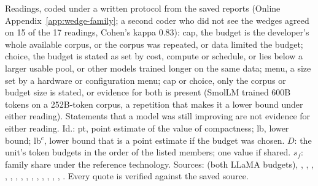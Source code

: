 \begin{table}[tp]
\medskip
\begin{tablenotes}
Readings, coded under a written protocol from the saved reports (Online Appendix~\ref{app:wedge-family}; a second coder who did not see the wedges agreed on 15 of the 17 readings, Cohen's kappa 0.83): cap, the budget is the developer's whole available corpus, or the corpus was repeated, or data limited the budget; choice, the budget is stated as set by cost, compute or schedule, or lies below a larger usable pool, or other models trained longer on the same data; menu, a size set by a hardware or configuration menu; cap or choice, only the corpus or budget size is stated, or evidence for both is present (SmolLM trained 600B tokens on a 252B-token corpus, a repetition that makes it a lower bound under either reading). Statements that a model was still improving are not evidence for either reading. Id.: pt, point estimate of the value of compactness; lb, lower bound; lb$^c$, lower bound that is a point estimate if the budget was chosen. $D$: the unit's token budgets in the order of the listed members; one value if shared. $s_f$: family share under the reference technology. Sources: \citet{touvron2023llama} (both LLaMA budgets), \citet{touvron2023llama2}, \citet{mosaicml2023mpt7b,mosaicml2023mpt30b}, \citet{stability2023stablelm}, \citet{bai2023qwen}, \citet{young2024yi}, \citet{bi2024deepseek}, \citet{grattafiori2024llama,meta2024llama3}, \citet{yang2024qwen2}, \citet{allal2024smollm}, \citet{qwen2024qwen25}, \citet{granite2024granite}, \citet{teamolmo2024olmo}, \citet{yang2025qwen3}, \citet{apertus2025apertus}, \citet{olmo2025olmo3}. Every quote is verified against the saved source.
\end{tablenotes}
\end{table}
